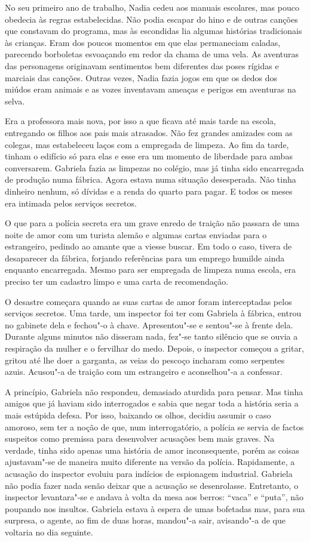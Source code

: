 No seu primeiro ano de trabalho, Nadia cedeu aos manuais escolares, mas
pouco obedecia às regras estabelecidas. Não podia escapar do hino e de
outras canções que constavam do programa, mas às escondidas lia algumas histórias tradicionais às crianças. Eram dos poucos momentos em que
elas permaneciam caladas, parecendo borboletas esvoaçando em redor da
chama de uma vela. As aventuras das personagens originavam sentimentos
bem diferentes das poses rígidas e marciais das canções. Outras vezes,
Nadia fazia jogos em que os dedos dos miúdos eram animais e as vozes
inventavam ameaças e perigos em aventuras na selva.

Era a professora mais nova, por isso a que ficava até mais tarde na
escola, entregando os filhos aos pais mais atrasados. Não fez grandes
amizades com as colegas, mas estabeleceu laços com a empregada de
limpeza. Ao fim da tarde, tinham o edifício só para elas e esse era um
momento de liberdade para ambas conversarem. Gabriela fazia as limpezas
no colégio, mas já tinha sido encarregada de produção numa fábrica.
Agora estava numa
situação desesperada. Não tinha dinheiro nenhum, só dívidas e a renda do
quarto para pagar. E todos os meses era intimada pelos serviços
secretos.

O que para a polícia secreta era um grave enredo de traição não passara
de uma noite de amor com um turista alemão e algumas cartas enviadas
para o estrangeiro, pedindo ao amante que a viesse buscar. Em todo o
caso, tivera de desaparecer da fábrica, forjando referências para um
emprego humilde ainda enquanto encarregada. Mesmo para ser empregada de
limpeza numa escola, era preciso ter um cadastro limpo e uma carta de
recomendação.

O desastre começara quando as suas cartas de amor foram interceptadas
pelos serviços secretos. Uma tarde, um inspector foi ter com Gabriela à
fábrica, entrou no gabinete dela e fechou"-o à chave. Apresentou"-se e
sentou"-se à frente dela. Durante alguns minutos não disseram nada, fez"-se
tanto silêncio que se ouvia a respiração da mulher e o fervilhar do
medo. Depois, o inspector começou a gritar, gritou até lhe doer a
garganta, as veias do pescoço incharam como serpentes azuis. Acusou"-a de
traição com um estrangeiro e aconselhou"-a a confessar.

A princípio,
Gabriela não respondeu, demasiado aturdida para pensar. Mas tinha
amigos que já haviam sido interrogados e sabia que negar toda a história
seria a mais estúpida defesa. Por isso, baixando os olhos, decidiu assumir o caso amoroso, sem ter a noção de que, num interrogatório, a
polícia se servia de factos suspeitos como premissa para desenvolver
acusações bem mais graves. Na verdade, tinha sido apenas uma história de
amor inconsequente, porém as coisas ajustavam"-se de maneira muito
diferente na
versão da polícia. Rapidamente, a acusação do inspector evoluiu para
indícios de espionagem industrial. Gabriela não podia fazer nada senão
deixar que a acusação se desenrolasse. Entretanto, o inspector
levantara"-se e andava à volta da mesa aos berros: ``vaca'' e ``puta'', não
poupando nos insultos. Gabriela estava à espera de umas bofetadas mas,
para sua surpresa, o agente, ao fim de duas horas, mandou"-a sair,
avisando"-a de que voltaria no dia seguinte.

